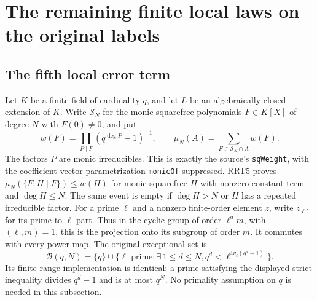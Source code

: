 \section{The remaining finite local laws on the original labels}
\label{sec:finite-local-completion-v43}


\subsection{The fifth local error term}

Let $K$ be a finite field of cardinality $q$, and let $L$ be an
algebraically closed extension of $K$.  Write $\mathcal S_N$ for the
monic squarefree polynomials $F\in K[X]$ of degree $N$ with
$F(0)\ne0$, and put
\[
 w(F)=\prod_{P\mid F}(q^{\deg P}-1)^{-1},\qquad
 \mu_N(A)=\sum_{F\in\mathcal S_N\cap A}w(F).
 \tag{FLC.1}
\]
The factors $P$ are monic irreducibles.  This is exactly the
source's \texttt{sqWeight}, with the coefficient-vector
parametrization \texttt{monicOf} suppressed.  RRT5 proves
$\mu_N(\{F:H\mid F\})\le w(H)$ for monic squarefree $H$ with
nonzero constant term and $\deg H\le N$.  The same event is empty
if $\deg H>N$ or $H$ has a repeated irreducible factor.
For a prime $\ell$ and a nonzero finite-order element $z$, write
$z_{\ell'}$ for its prime-to-$\ell$ part.  Thus in the cyclic group
of order $\ell^a m$, with $(\ell,m)=1$, this is the projection
onto its subgroup of order $m$.  It commutes with every power map.
The original exceptional set is
\[
 \mathcal B(q,N)=\{q\}\cup
 \{\ell\text{ prime}:\exists\,1\le d\le N,
          q^d<\ell^{4v_\ell(q^d-1)}\}.
 \tag{FLC.2}
\]
Its finite-range implementation is identical: a prime satisfying
the displayed strict inequality divides $q^d-1$ and is at most
$q^N$.  No primality assumption on $q$ is needed in this subsection.

